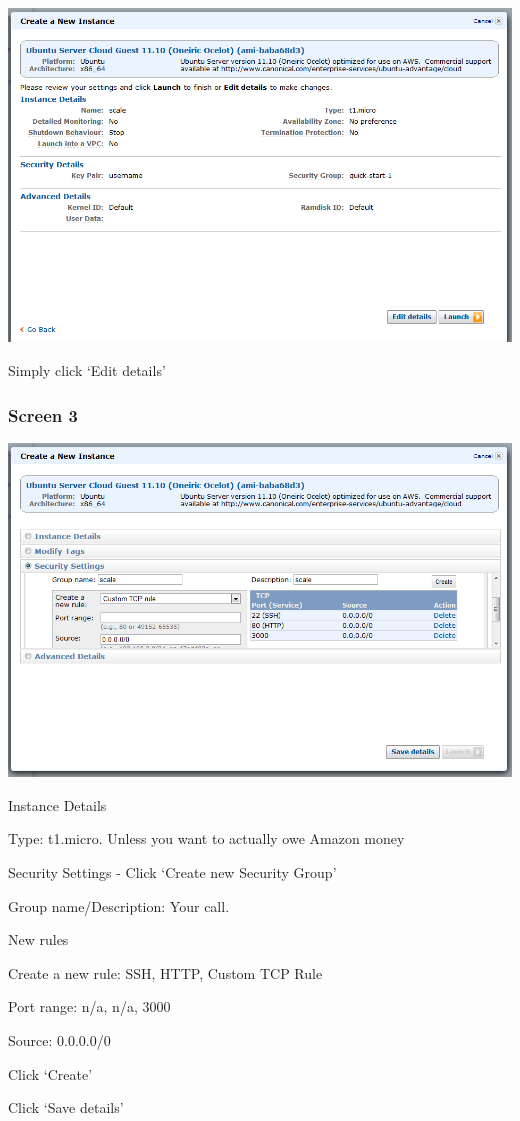 \documentclass{article}
\begin{document}
\includegraphics[width=6in]{screen2}

Simply click `Edit details'

\subsubsection*{Screen 3}

\includegraphics[width=6in]{screen3}

\begin{enumerate*}
\item Instance Details
\begin{enumerate*}
\item Type: t1.micro. Unless you want to actually owe Amazon money
\end{enumerate*}
\item Security Settings - Click `Create new Security Group'
\begin{enumerate*}
\item Group name/Description: Your call.
\item New rules
\begin{enumerate*}
\item Create a new rule: SSH, HTTP, Custom TCP Rule
\item Port range: n/a, n/a, 3000
\item Source: 0.0.0.0/0
\end{enumerate*}
\item Click `Create'
\end{enumerate*}
\item Click `Save details'
\end{enumerate*}
\end{document}
